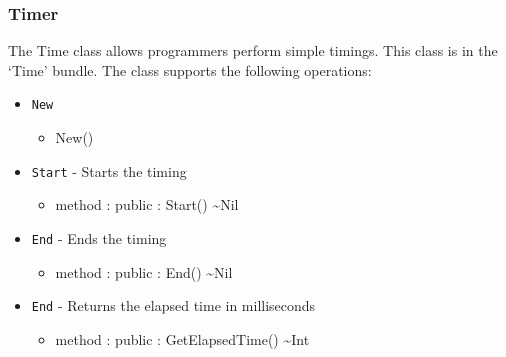 \documentclass[11pt]{article}
\begin{document}
\subsubsection{Timer}
The Time class allows programmers perform simple timings.  This class is in the `Time' bundle.  The class supports the following operations:
\begin{itemize}
\item \texttt{New}
  \begin{itemize}
  \item New()
  \end{itemize}
\item \texttt{Start} - Starts the timing
  \begin{itemize}
  \item method : public : Start() \textasciitilde Nil
  \end{itemize}
\item \texttt{End} - Ends the timing
  \begin{itemize}
  \item method : public : End() \textasciitilde Nil
  \end{itemize}
\item \texttt{End} - Returns the elapsed time in milliseconds
  \begin{itemize}
  \item  method : public : GetElapsedTime() \textasciitilde Int
  \end{itemize}
\end{itemize}
\end{document}
